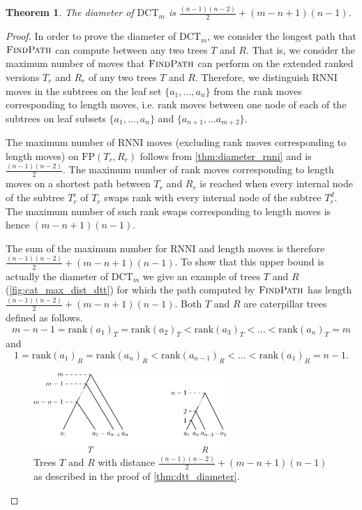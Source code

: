 \documentclass[11pt]{amsart}
\newtheorem{theorem}{Theorem}
\newcommand{\rnni}{\mathrm{RNNI}}
\newcommand{\findpath}{\textsc{FindPath}}
\newcommand{\rank}{\mathrm{rank}}
\newcommand{\fp}{\mathrm{FP}}
\newcommand{\dtt}{\mathrm{DCT}}
\begin{document}
\begin{theorem}
	The diameter of $\dtt_m$ is $\frac{(n-1)(n-2)}{2} + (m-n+1)(n-1)$.
	\label{thm:dtt_diameter}
\end{theorem}

\begin{proof}
	In order to prove the diameter of $\dtt_m$, we consider the longest path that $\findpath$ can compute between any two trees $T$ and $R$.
	That is, we consider the maximum number of moves that $\findpath$ can perform on the extended ranked versions $T_r$ and $R_r$ of any two trees $T$ and $R$.
	Therefore, we distinguish $\rnni$ moves in the subtrees on the leaf set $\{a_1, \ldots, a_n\}$ from the rank moves corresponding to length moves, i.e. rank moves between one node of each of the subtrees on leaf subsets $\{a_1, \ldots, a_n\}$ and $\{a_{n+1}, \ldots a_{m+2}\}$.

	The maximum number of $\rnni$ moves (excluding rank moves corresponding to length moves) on $\fp(T_r,R_r)$ follows from \autoref{thm:diameter_rnni} and is $\frac{(n-1)(n-2)}{2}$.
	The maximum number of rank moves corresponding to length moves on a shortest path between $T_r$ and $R_r$ is reached when every internal node of the subtree $T_r^c$ of $T_r$ swaps rank with every internal node of the subtree $T_r^d$.
	The maximum number of such rank swaps corresponding to length moves is hence $(m-n+1)(n-1)$.

	The sum of the maximum number for $\rnni$ and length moves is therefore $\frac{(n-1)(n-2)}{2} + (m-n+1)(n-1)$.
	To show that this upper bound is actually the diameter of $\dtt_m$ we give an example of trees $T$ and $R$ (\autoref{fig:cat_max_dist_dtt}) for which the path computed by $\findpath$ has length $\frac{(n-1)(n-2)}{2} + (m-n+1)(n-1)$.
	Both $T$ and $R$ are caterpillar trees defined as follows.
	\[m-n-1 = \rank(a_1)_T = \rank(a_2)_T < \rank(a_3)_T < \ldots < \rank(a_n)_T = m\]
	and
	\[1 = \rank(a_1)_R = \rank(a_n)_R < \rank(a_{n-1})_R < \ldots < \rank(a_1)_R = n-1.\]
	\begin{figure}[ht]
		\includegraphics[width=0.65\textwidth]{cat_max_dist_dtt.eps}
		\caption{Trees $T$ and $R$ with distance $\frac{(n-1)(n-2)}{2} + (m-n+1)(n-1)$ as described in the proof of \autoref{thm:dtt_diameter}.}
		\label{fig:cat_max_dist_dtt}
	\end{figure}
\end{proof}
\end{document}
